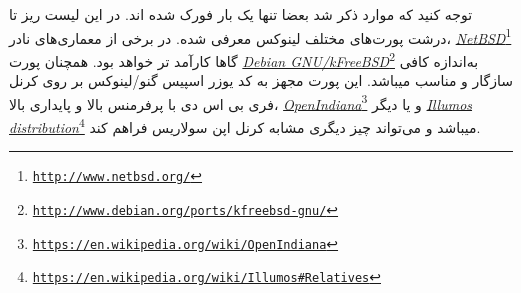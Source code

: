 توجه کنید که موارد ذکر شد بعضا تنها یک بار فورک شده اند. در این لیست ریز تا درشت
پورت‌های مختلف لینوکس معرفی شده. در برخی از معماری‌های نادر،
\emph{\url{NetBSD}}\footnote{\texttt{\url{http://www.netbsd.org/}}}
گاها کارآمد تر خواهد بود. همچنان پورت
\emph{\url{Debian GNU/kFreeBSD}}\footnote{\texttt{\url{http://www.debian.org/ports/kfreebsd-gnu/}}}
به‌اندازه کافی سازگار و مناسب میباشد. این پورت مجهز به کد یوزر اسپیس گنو/لینوکس بر روی کرنل فری بی اس دی با پرفرمنس بالا و پایداری بالا،
\emph{\url{OpenIndiana}}\footnote{\texttt{\url{https://en.wikipedia.org/wiki/OpenIndiana}}}
و یا دیگر 
\emph{\url{Illumos distribution}}\footnote{\texttt{\url{https://en.wikipedia.org/wiki/Illumos#Relatives}}}
میباشد و می‌تواند چیز دیگری مشابه کرنل اپن سولاریس فراهم کند.


